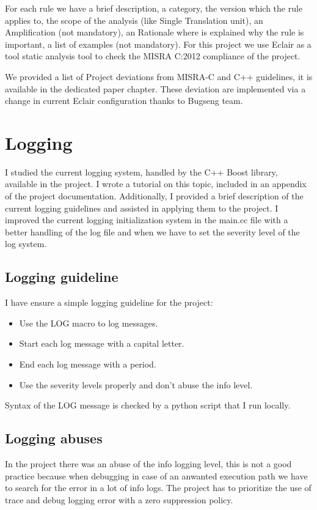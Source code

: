 \documentclass[a4paper, 12pt]{article}
\begin{document}
For each rule we have a brief description, a category, the version which the rule applies to, the scope of the analysis (like Single Translation unit), 
an Amplification (not mandatory), an Rationale where is explained why the rule is important, a list of examples (not mandatory).
For this project we use Eclair \cite{Eclair} as a tool static analysis tool to check the MISRA C:2012 compliance of the project.

We provided a list of Project deviations from MISRA-C and C++ guidelines, it is available in the dedicated paper chapter.
These deviation are implemented via a change in current Eclair configuration thanks to Bugseng team.

\section{Logging}

I studied the current logging system, handled by the C++ Boost library, available in the project. 
I wrote a tutorial on this topic, included in an appendix of the project documentation. Additionally, I provided a brief description of the current logging guidelines and assisted in applying them to the project.
I improved the current logging initialization system in the main.cc file with a better handling of the log file and when we have to set the 
severity level of the log system.

\subsection{Logging guideline}

I have ensure a simple logging guideline for the project:

\begin{itemize}
    \item Use the LOG macro to log messages.
    \item Start each log message with a capital letter.
    \item End each log message with a period.
    \item Use the severity levels properly and don't abuse the info level.
\end{itemize}

Syntax of the LOG message is checked by a python script that I run locally.

\subsection{Logging abuses}
In the project there was an abuse of the info logging level, this is not a good practice because when debugging in case of an anwanted execution path we have to search for the error in a lot of info logs.
The project has to prioritize the use of trace and debug logging error with a zero suppression policy.
\end{document}

